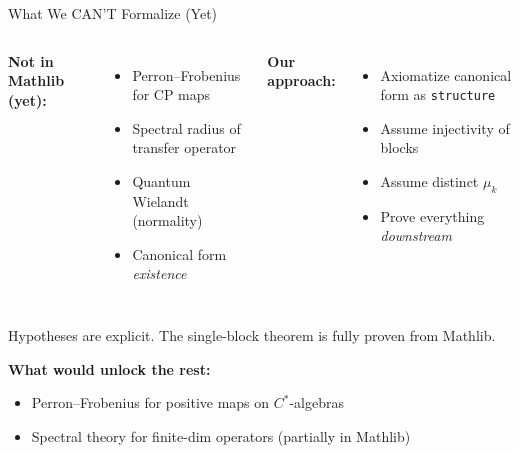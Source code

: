 \documentclass[aspectratio=169,10pt]{beamer}
\begin{document}
\begin{frame}{What We CAN'T Formalize (Yet)}
\vspace{-0.2em}
\begin{columns}[T]
{\small\textbf{\textcolor{softred}{Not in Mathlib (yet):}}}
\begin{itemize}\itemsep0.1em
  \item {\small Perron--Frobenius for CP maps}
  \item {\small Spectral radius of transfer operator}
  \item {\small Quantum Wielandt (normality)}
  \item {\small Canonical form \emph{existence}}
\end{itemize}

{\small\textbf{\textcolor{leangreen}{Our approach:}}}
\begin{itemize}\itemsep0.1em
  \item {\small Axiomatize canonical form as \texttt{structure}}
  \item {\small Assume injectivity of blocks}
  \item {\small Assume distinct $\mu_k$}
  \item {\small Prove everything \emph{downstream}}
\end{itemize}
\end{columns}

\vspace{0.4em}
{\small Hypotheses are explicit. The single-block theorem is fully proven from Mathlib.}

\vspace{0.3em}
{\small\textbf{What would unlock the rest:}}
\begin{itemize}\itemsep0.05em
  \item {\small Perron--Frobenius for positive maps on $C^*$-algebras}
  \item {\small Spectral theory for finite-dim operators (partially in Mathlib)}
\end{itemize}
\end{frame}
\end{document}
